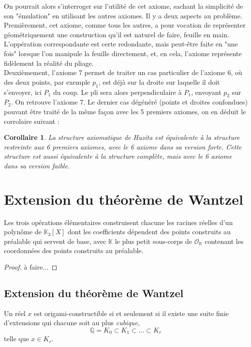 \documentclass[a4paper,12pt,french,draft]{report}
\newtheorem{corollaire}{Corollaire}[section]
\begin{document}
		On pourrait alors s'interroger sur l'utilité de cet axiome, sachant la simplicité de son "émulation" en utilisant les autres axiomes. Il y a deux aspects au problème. Premièrement, cet axiome, comme tous les autres, a pour vocation de représenter géométriquement une construction qu'il est naturel de faire, feuille en main. L'oppération correspondante est certe redondante, mais peut-être faite en "une fois" lorsque l'on manipule la feuille directement, et, en cela, l'axiome représente fidèlement la réalité du pliage.\\
		Deuxièmement, l'axiome 7 permet de traiter un cas particulier de l'axiome 6, où des deux points, par exemple $p_{1}$, est déjà sur la droite sur laquelle il doit s'envoyer, ici $P_{1}$ du coup. Le pli sera alors perpendiculaire à $P_{1}$, envoyant $p_{2}$ sur $P_{2}$. On retrouve l'axiome 7. Le dernier cas dégénéré (points et droites confondues) pouvant être traité de la même façon avec les 5 premiers axiomes, on en déduit le corrolaire suivant :
		
		\begin{corollaire}
			La structure axiomatique de Huzita est équivalente à la structure restreinte aux 6 premiers axiomes, avec le 6 axiome dans sa version forte. Cette structure est aussi équivalente à la structure complète, mais avec le 6 axiome dans sa version faible.
		\end{corollaire}
		
	\section{Extension du théorème de Wantzel}
	
	\begin{proposition}
				Les trois opérations élémentaires construisent chacune les racines réelles d'un polynôme de \(\mathbb{K}_3[X]\) dont les coefficients dépendent des points construits au préalable qui servent de base, avec $\mathbb{K}$ le plus petit sous-corps de $\mathcal{O}_\mathbb{R}$ contenant les coordonnées des points construits au préalable.
	\end{proposition}
	
	\begin{proof}
		à faire...
	\end{proof}
	
	
	\subsection{Extension du théorème de Wantzel}
		\begin{theorem}
			Un réel \( x \) est origami-constructible si et seulement si il existe une suite finie d'extensions qui chacune soit au plus \emph{cubique},
					\[
					\mathbb{Q} = K_0 \subset K_1 \subset \dots \subset K_r
					\]
			telle que \( x \in K_r \).
		\end{theorem}
	
\end{document}

